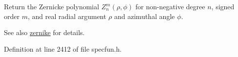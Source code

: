 Return the Zernicke polynomial $ Z_n^m(\rho,\phi) $ for non-\/negative degree $ n $, signed order $ m $, and real radial argument $ \rho $ and azimuthal angle $ \phi $.

\begin{DoxySeeAlso}{See also}
\hyperlink{group__gnu__math__spec__func_gaaed33f29c1eb1d2c5b9590fe2e57151c}{zernike} for details. 
\end{DoxySeeAlso}


Definition at line 2412 of file specfun.\+h.

